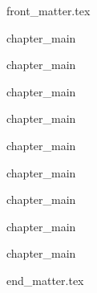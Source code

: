 \documentclass[cover]{dissertation}
\begin{document}
\sloppy
\def \myAuthorName{Hamed Darbandi}
\def \myTitle{Non-Invasive Fitness Assessment in Horses}
\def \mySubTitle{Integrating Wearables and Machine Learning}



\newcommand{\mainrq}{
\medskip
\textit{
"How can we reliably and accurately evaluate the fitness of sport horses in a non-invasive manner?" 
}
\medskip
}

\ifdraft
\else
    {front_matter.tex}
\fi

\tableofcontents
\ifdraft
\fi

\mainmatter
\thumbtrue

\chaponetrue
\chaptwotrue
\chapthreetrue
\chapfourtrue
\chapfivetrue
\chapsixtrue
\chapseventrue
\chapeighttrue

\ifchapone
    {chapter_main}
\fi

 \ifchaptwo
     {chapter_main}
 \fi

\ifchapthree
    {chapter_main}
\fi

 \ifchapfour
     {chapter_main}
 \fi
 
   \ifchapfive
     {chapter_main}
 \fi

\ifchapsix
     {chapter_main}
 \fi

\ifchapseven
     {chapter_main}
\fi
  
\ifchapeight
     {chapter_main}
\fi

\ifchapnine
    {chapter_main}
\fi
 

\thumbfalse
\FloatBarrier

{end_matter.tex}
\end{document}
